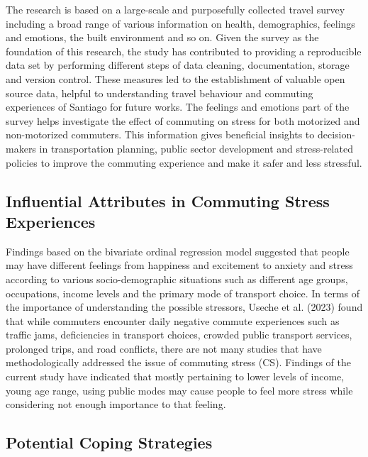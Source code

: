 \documentclass[
11pt, %
oneside, %
english, %
singlespacing, %
]{macthesis} %
\begin{document}
The research is based on a large-scale and purposefully collected travel survey including a broad range of various information on health, demographics, feelings and emotions, the built environment and so on. Given the survey as the foundation of this research, the study has contributed to providing a reproducible data set by performing different steps of data cleaning, documentation, storage and version control. These measures led to the establishment of valuable open source data, helpful to understanding travel behaviour and commuting experiences of Santiago for future works. The feelings and emotions part of the survey helps investigate the effect of commuting on stress for both motorized and non-motorized commuters. This information gives beneficial insights to decision-makers in transportation planning, public sector development and stress-related policies to improve the commuting experience and make it safer and less stressful.

\hypertarget{influential-attributes-in-commuting-stress-experiences}{%
\subsection{Influential Attributes in Commuting Stress Experiences}\label{influential-attributes-in-commuting-stress-experiences}}

Findings based on the bivariate ordinal regression model suggested that people may have different feelings from happiness and excitement to anxiety and stress according to various socio-demographic situations such as different age groups, occupations, income levels and the primary mode of transport choice. In terms of the importance of understanding the possible stressors, Useche et al. (2023) found that while commuters encounter daily negative commute experiences such as traffic jams, deficiencies in transport choices, crowded public transport services, prolonged trips, and road conflicts, there are not many studies that have methodologically addressed the issue of commuting stress (CS). Findings of the current study have indicated that mostly pertaining to lower levels of income, young age range, using public modes may cause people to feel more stress while considering not enough importance to that feeling.

\hypertarget{potential-coping-strategies}{%
\subsection{Potential Coping Strategies}\label{potential-coping-strategies}}
\end{document}
